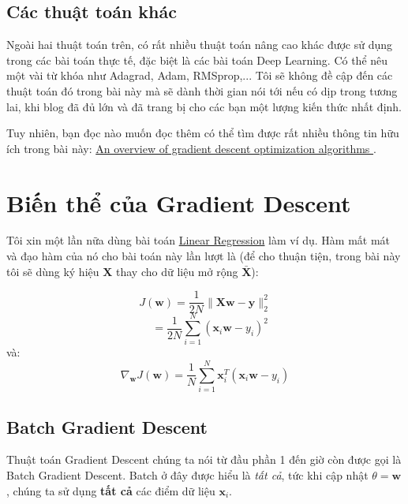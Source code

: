  
\subsection{Các thuật toán khác}
Ngoài hai thuật toán trên, có rất nhiều thuật toán nâng cao khác được sử dụng trong các bài toán thực tế, đặc biệt là các bài toán Deep Learning. Có thể nêu một vài từ khóa như Adagrad, Adam, RMSprop,... Tôi sẽ không đề cập đến các thuật toán đó trong bài này mà sẽ dành thời gian nói tới nếu có dịp trong tương lai, khi blog đã đủ lớn và đã trang bị cho các bạn một lượng kiến thức nhất định.  
 
Tuy nhiên, bạn đọc nào muốn đọc thêm có thể tìm được rất nhiều thông tin hữu ích trong bài này: 
\href{http://sebastianruder.com/optimizing-gradient-descent/index.html#stochasticgradientdescent}{An overview of gradient descent optimization algorithms }. 
 
 
\section{Biến thể của Gradient Descent}
Tôi xin một lần nữa dùng bài toán \href{http://machinelearningcoban.com/2016/12/28/linearregression/}{Linear Regression} làm ví dụ. Hàm mất mát và đạo hàm của nó cho bài toán này lần lượt là (để cho thuận tiện, trong bài này tôi sẽ dùng ký hiệu $\mathbf{X}$ thay cho dữ liệu mở rộng $\bar{\mathbf{X}}$): 
 
\begin{equation} 
J(\mathbf{w}) = \frac{1}{2N}\|\mathbf{X}\mathbf{w} - \mathbf{y}\|_2^2 
\end{equation} 
\begin{equation} 
~~~~ = \frac{1}{2N} \sum_{i=1}^N(\mathbf{x}_i \mathbf{w} - y_i)^2 
\end{equation} 
và: 
\begin{equation} 
\nabla_{\mathbf{w}} J(\mathbf{w}) = \frac{1}{N}\sum_{i=1}^N \mathbf{x}_i^T(\mathbf{x}_i\mathbf{w} - y_i) 
\end{equation} 
 
 
\subsection{Batch Gradient Descent }
Thuật toán Gradient Descent chúng ta nói từ đầu phần 1 đến giờ còn được gọi là Batch Gradient Descent. Batch ở đây được hiểu là \textit{tất cả}, tức khi cập nhật $\theta = \mathbf{w}$, chúng ta sử dụng \textbf{tất cả} các điểm dữ liệu $\mathbf{x}_i$.  
 
